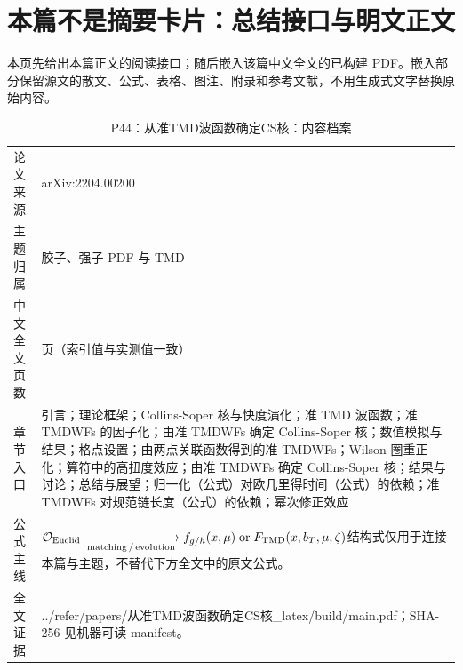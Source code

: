 \documentclass[UTF8,11pt,oneside]{ctexbook}
\begin{document}
\section*{本篇不是摘要卡片：总结接口与明文正文}
本页先给出本篇正文的阅读接口；随后嵌入该篇中文全文的已构建 PDF。嵌入部分保留源文的散文、公式、表格、图注、附录和参考文献，不用生成式文字替换原始内容。
\begin{table}[htbp]
  \centering
  \caption{P44：从准TMD波函数确定CS核：内容档案}
  \small
  \begin{tabularx}{0.96\textwidth}{@{}p{3.3cm}>{\raggedright\arraybackslash}X@{}}
    \toprule
    论文来源 & arXiv:2204.00200 \\
    主题归属 & 胶子、强子 PDF 与 TMD \\
    中文全文页数 & 24 页（索引值与实测值一致） \\
    章节入口 & 引言；理论框架；Collins-Soper 核与快度演化；准 TMD 波函数；准 TMDWFs 的因子化；由准 TMDWFs 确定 Collins-Soper 核；数值模拟与结果；格点设置；由两点关联函数得到的准 TMDWFs；Wilson 圈重正化；算符中的高扭度效应；由准 TMDWFs 确定 Collins-Soper 核；结果与讨论；总结与展望；归一化（公式）对欧几里得时间（公式）的依赖；准 TMDWFs 对规范链长度（公式）的依赖；幂次修正效应 \\
    公式主线 & $\mathcal O_{\rm Euclid}\xrightarrow[\rm matching\,/\,evolution]{}f_{g/h}(x,\mu)\;{\rm or}\;F_{\rm TMD}(x,b_T,\mu,\zeta)$\newline\scriptsize 结构式仅用于连接本篇与主题，不替代下方全文中的原文公式。 \\
    全文证据 & ../\allowbreak{}refer/\allowbreak{}papers/\allowbreak{}从准TMD波函数确定CS核\_\allowbreak{}latex/\allowbreak{}build/\allowbreak{}main.pdf；SHA-256 见机器可读 manifest。 \\
    \bottomrule
  \end{tabularx}
\end{table}
\end{document}
